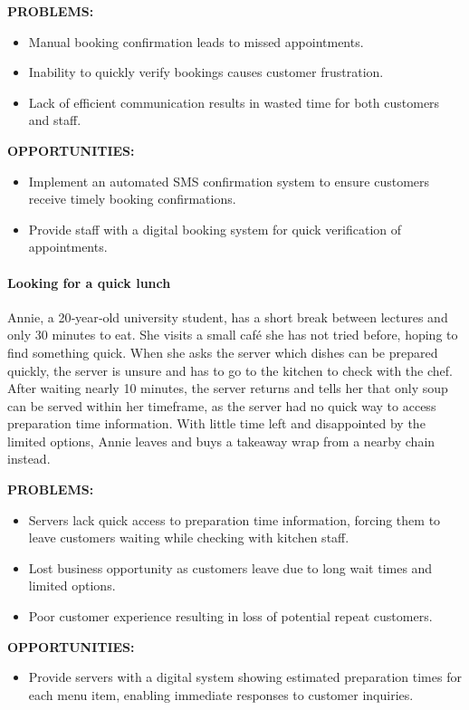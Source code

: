 \documentclass[]{VUMIFTemplateClass}
\newcommand{\subsubsubsection}[1]{\paragraph{#1}}
\begin{document}
\textbf{PROBLEMS:}
\begin{itemize}
    \item Manual booking confirmation leads to missed appointments.
    \item Inability to quickly verify bookings causes customer frustration.
    \item Lack of efficient communication results in wasted time for both customers and staff.
\end{itemize}
\textbf{OPPORTUNITIES:}
\begin{itemize}
    \item Implement an automated SMS confirmation system to ensure customers receive timely booking confirmations.
    \item Provide staff with a digital booking system for quick verification of appointments.
\end{itemize}

\subsubsubsection{Looking for a quick lunch}

Annie, a 20‑year‑old university student, has a short break between lectures and
only 30 minutes to eat. She visits a small café she has not tried before, hoping
to find something quick. When she asks the server which dishes can be prepared
quickly, the server is unsure and has to go to the kitchen to check with the
chef. After waiting nearly 10 minutes, the server returns and tells her that
only soup can be served within her timeframe, as the server had no quick way to
access preparation time information. With little time left and disappointed by
the limited options, Annie leaves and buys a takeaway wrap from a nearby chain
instead.

\textbf{PROBLEMS:}
\begin{itemize}
    \item Servers lack quick access to preparation time information, forcing them to leave customers waiting while checking with kitchen staff.
    \item Lost business opportunity as customers leave due to long wait times and limited options.
    \item Poor customer experience resulting in loss of potential repeat customers.
\end{itemize}
\textbf{OPPORTUNITIES:}
\begin{itemize}
    \item Provide servers with a digital system showing estimated preparation times for each menu item, enabling immediate responses to customer inquiries.
\end{itemize}
\end{document}
